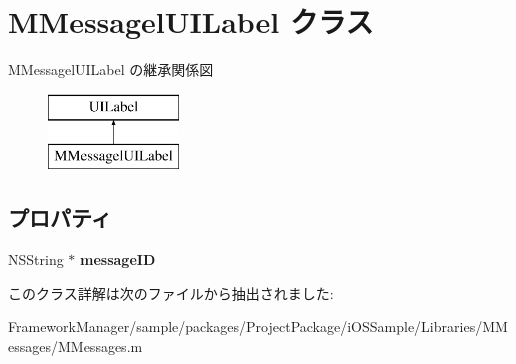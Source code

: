 \hypertarget{interface_m_messagel_u_i_label}{}\section{M\+Messagel\+U\+I\+Label クラス}
\label{interface_m_messagel_u_i_label}
M\+Messagel\+U\+I\+Label の継承関係図\begin{figure}[H]
\begin{center}
\leavevmode
\includegraphics[height=2.000000cm]{interface_m_messagel_u_i_label}
\end{center}
\end{figure}
\subsection*{プロパティ}
\begin{DoxyCompactItemize}
\item 
\hypertarget{interface_m_messagel_u_i_label_a8c542718e3a5d59141a85b5e9e6641b5}{}N\+S\+String $\ast$ {\bfseries message\+I\+D}\label{interface_m_messagel_u_i_label_a8c542718e3a5d59141a85b5e9e6641b5}

\end{DoxyCompactItemize}


このクラス詳解は次のファイルから抽出されました\+:\begin{DoxyCompactItemize}
\item 
Framework\+Manager/sample/packages/\+Project\+Package/i\+O\+S\+Sample/\+Libraries/\+M\+Messages/M\+Messages.\+m\end{DoxyCompactItemize}

